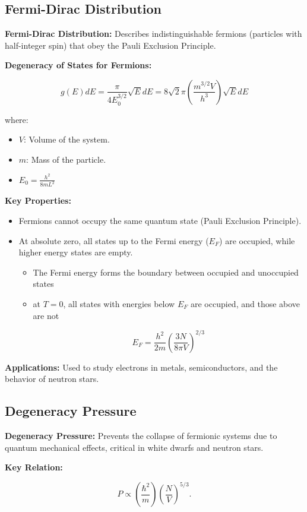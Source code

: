 \documentclass{article}
\newcommand{\eqbox}[1]{\begin{tcolorbox}[colback=gray!10] #1 \end{tcolorbox}}
\newcommand{\conceptbox}[1]{\begin{tcolorbox}[colback=blue!10] #1 \end{tcolorbox}}
\begin{document}
\subsection{Fermi-Dirac Distribution}
\conceptbox{
\textbf{Fermi-Dirac Distribution:}
Describes indistinguishable fermions (particles with half-integer spin) that obey the Pauli Exclusion Principle.

\textbf{Degeneracy of States for Fermions:}
\eqbox{
\[
g(E)dE = \frac{\pi}{4 E_0^{3/2}}\sqrt E dE = 8\sqrt{2}\pi \left(\frac{m^{3/2}V}{h^3}\right)\sqrt E dE
\]
}
where:
\begin{itemize}
    \item \( V \): Volume of the system.
    \item \( m \): Mass of the particle.
    \item \(E_0 = \displaystyle\frac{h^2}{8mL^2}\)
\end{itemize}

\textbf{Key Properties:}
\begin{itemize}
    \item Fermions cannot occupy the same quantum state (Pauli Exclusion Principle).
    \item At absolute zero, all states up to the Fermi energy (\( E_F \)) are occupied, while higher energy states are empty.
    \begin{itemize}
        \item The Fermi energy forms the boundary between occupied and unoccupied states
        \item at \(T = 0\), all states with energies below \( E_F \) are occupied, and those above are not
        \eqbox{
            \[
                E_F = \displaystyle\frac{h^2}{2m}\left(\displaystyle\frac{3N}{8\pi V}\right)^{2/3}
            \]
        }
    \end{itemize}
\end{itemize}

\textbf{Applications:}
Used to study electrons in metals, semiconductors, and the behavior of neutron stars.
}



\subsection{Degeneracy Pressure}
\conceptbox{
\textbf{Degeneracy Pressure:}
Prevents the collapse of fermionic systems due to quantum mechanical effects, critical in white dwarfs and neutron stars.

\textbf{Key Relation:}
\eqbox{
\[
P \propto \left(\frac{\hbar^2}{m}\right)\left(\frac{N}{V}\right)^{5/3}.
\]
}
}
\end{document}

